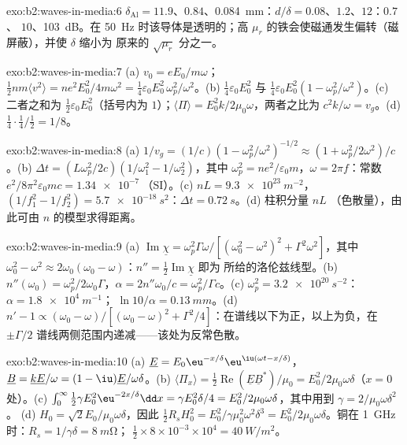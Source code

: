 \begin{solution}{exo:b2:waves-in-media:6}
$\delta_{\text{Al}} = 11.9$、$0.84$、\qty{0.084}{mm}：$d/\delta = 0.08$、$1.2$、$12$：$0.7$、
$10$、\qty{103}{dB}。在 \qty{50}{Hz} 时该导体是透明的；高
$\mu_r$ 的铁会使磁通发生偏转（磁屏蔽），并使 $\delta$ 缩小为
原来的 $\sqrt{\mu_r}$ 分之一。
\end{solution}

\begin{solution}{exo:b2:waves-in-media:7}
(a) $v_0 = eE_0/m\omega$；$\tfrac12nm\langle v^2\rangle = ne^2E_0^2/4m\omega^2 = \tfrac14\varepsilon_0
E_0^2\,\omega_p^2/\omega^2$。(b) $\tfrac14\varepsilon_0E_0^2$ 与 $\tfrac14\varepsilon_0E_0^2(1 - \omega_p^2/
\omega^2)$。(c) 二者之和为 $\tfrac12\varepsilon_0E_0^2$（括号内为 $1$）；$\langle\Pi
\rangle = E_0^2k/2\mu_0\omega$，两者之比为 $c^2k/\omega = v_g$。(d) $\tfrac14\cdot\tfrac14
/\tfrac12 = 1/8$。
\end{solution}

\begin{solution}{exo:b2:waves-in-media:8}
(a) $1/v_g = (1/c)(1 - \omega_p^2/\omega^2)^{-1/2} \approx (1 + \omega_p^2/2\omega^2)/c$。(b) $\Delta t
= (L\omega_p^2/2c)(1/\omega_1^2 - 1/\omega_2^2)$，其中 $\omega_p^2 = ne^2/\varepsilon_0m$，$\omega =
2\pi f$：常数 $e^2/8\pi^2\varepsilon_0mc = \qty{1.34e-7}{}$（SI）。(c) $nL = \qty{9.3e23}{m^{-2}}$，
$(1/f_1^2 - 1/f_2^2) = \qty{5.7e-18}{s^2}$：$\Delta t = \qty{0.72}{s}$。(d) 柱积分量 $nL$
（色散量），由此可由 $n$ 的模型求得距离。
\end{solution}

\begin{solution}{exo:b2:waves-in-media:9}
(a) $\operatorname{Im}\underline\chi = \omega_p^2\Gamma\omega/[(\omega_0^2 - \omega^2)^2 + \Gamma^2\omega^2]$，其中
$\omega_0^2 - \omega^2 \approx 2\omega_0(\omega_0 - \omega)$：$n'' = \tfrac12\operatorname{Im}\underline\chi$ 即为
所给的洛伦兹线型。(b) $n''(\omega_0) = \omega_p^2/2\omega_0\Gamma$，$\alpha = 2n''\omega_0/c =
\omega_p^2/\Gamma c$。(c) $\omega_p^2 = \qty{3.2e20}{s^{-2}}$：$\alpha = \qty{1.8e4}{m^{-1}}$；
$\ln10/\alpha = \qty{0.13}{mm}$。(d) $n' - 1 \propto (\omega_0 - \omega)/[(\omega_0 - \omega)^2 +
\Gamma^2/4]$：在谱线以下为正，以上为负，在 $\pm\Gamma/2$
谱线两侧范围内递减——该处为反常色散。
\end{solution}

\begin{solution}{exo:b2:waves-in-media:10}
(a) $\underline E = E_0\eu^{-x/\delta}\eu^{\iu(\omega t - x/\delta)}$，$\underline B = \underline k\underline E/\omega
= (1 - \iu)\underline E/\omega\delta$。(b) $\langle\Pi_x\rangle = \tfrac12\operatorname{Re}(\underline E
\underline B^*)/\mu_0 = E_0^2/2\mu_0\omega\delta$（$x = 0$ 处）。(c) $\int_0^\infty\tfrac12\gamma E_0^2
\eu^{-2x/\delta}\dd x = \gamma E_0^2\delta/4 = E_0^2/2\mu_0\omega\delta$，其中用到 $\gamma = 2/\mu_0\omega\delta^2$。
(d) $H_0 = \sqrt2E_0/\mu_0\omega\delta$，因此 $\tfrac12R_sH_0^2 = E_0^2/\gamma\mu_0^2\omega^2\delta^3 =
E_0^2/2\mu_0\omega\delta$。铜在 \qty{1}{GHz} 时：$R_s = 1/\gamma\delta = \qty{8}{m\ohm}$；
$\tfrac12 \times 8 \times 10^{-3} \times 10^4 = \qty{40}{W/m^2}$。
\end{solution}

